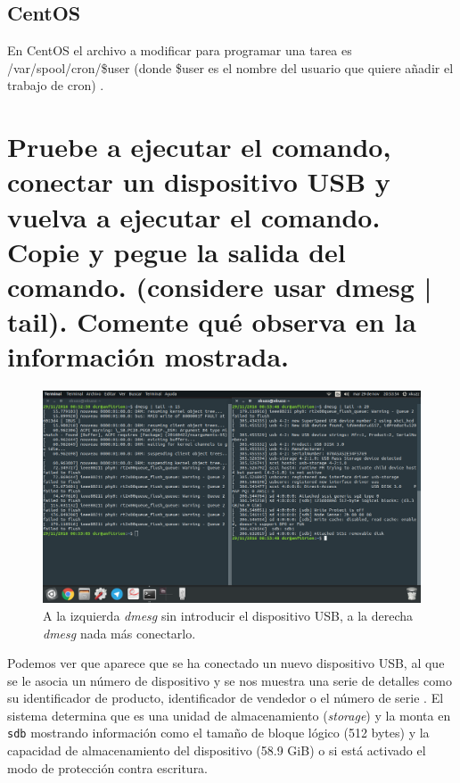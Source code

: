 \subsection{CentOS}
En CentOS el archivo a modificar para programar una tarea es /var/spool/cron/\$user (donde \$user es el nombre del usuario que quiere añadir el trabajo de cron) \cite{c2b}.
\section{Pruebe a ejecutar el comando, conectar un dispositivo USB y vuelva a ejecutar el comando. Copie y pegue la salida del comando. (considere usar dmesg | tail). Comente qué observa en la información mostrada.}
\begin{figure}[H]
	\centering
	\includegraphics[scale=0.3]{usb.png}
	\caption{A la izquierda \textit{dmesg} sin introducir el dispositivo USB, a la derecha \textit{dmesg} nada más conectarlo.}
\end{figure}

Podemos ver que aparece que se ha conectado un nuevo dispositivo USB, al que se le asocia un número de dispositivo y se nos muestra una serie de detalles como su identificador de producto, identificador de vendedor o el número de serie \cite{c3}. El sistema determina que es una unidad de almacenamiento (\textit{storage}) y la monta en \verb|sdb| mostrando información como el tamaño de bloque lógico (512 bytes) y la capacidad de almacenamiento del dispositivo (58.9 GiB) o si está activado el modo de protección contra escritura.


